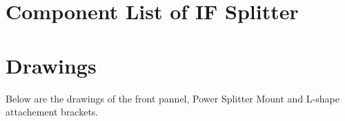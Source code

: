 \documentclass[12pt,a4paper,oneside]{article}
\begin{document}
\newpage
 

\appendix

% 


\begin{landscape}
\section{Component List of IF Splitter}\label{sec:Part_List}


\begin{table}[H]
\centering
{}
\label{tab:IF_components}
\end{table}


\section{Drawings}
\label{sec:Drawings}
Below are the drawings of the front pannel, Power Splitter Mount and L-shape attachement brackets.




%
%

\end{landscape}
\end{document}
